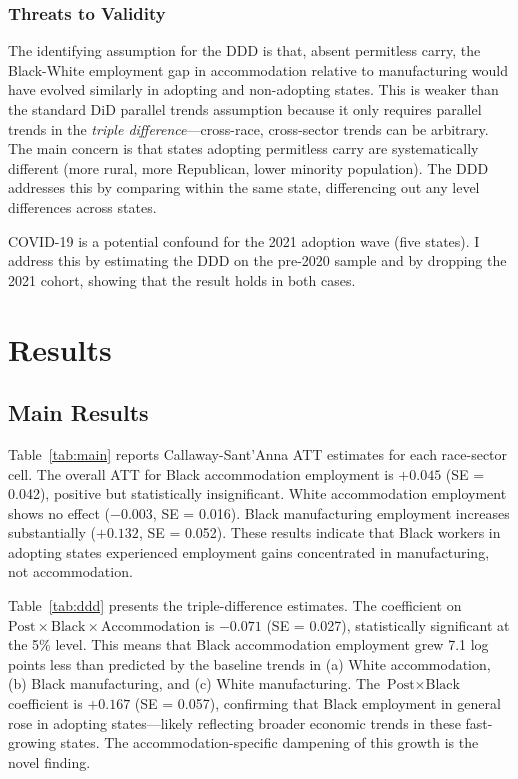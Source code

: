 \documentclass[12pt]{article}
\begin{document}
\subsubsection*{Threats to Validity} The identifying assumption for the DDD is that, absent permitless carry, the Black-White employment gap in accommodation relative to manufacturing would have evolved similarly in adopting and non-adopting states. This is weaker than the standard DiD parallel trends assumption because it only requires parallel trends in the \emph{triple difference}---cross-race, cross-sector trends can be arbitrary. The main concern is that states adopting permitless carry are systematically different (more rural, more Republican, lower minority population). The DDD addresses this by comparing within the same state, differencing out any level differences across states.

COVID-19 is a potential confound for the 2021 adoption wave (five states). I address this by estimating the DDD on the pre-2020 sample and by dropping the 2021 cohort, showing that the result holds in both cases.

\section{Results}
\label{sec:results}

\subsection{Main Results}



Table~\ref{tab:main} reports Callaway-Sant'Anna ATT estimates for each race-sector cell. The overall ATT for Black accommodation employment is $+0.045$ (SE = 0.042), positive but statistically insignificant. White accommodation employment shows no effect ($-0.003$, SE = 0.016). Black manufacturing employment increases substantially ($+0.132$, SE = 0.052). These results indicate that Black workers in adopting states experienced employment gains concentrated in manufacturing, not accommodation.



Table~\ref{tab:ddd} presents the triple-difference estimates. The coefficient on $\text{Post} \times \text{Black} \times \text{Accommodation}$ is $-0.071$ (SE = 0.027), statistically significant at the 5\% level. This means that Black accommodation employment grew 7.1 log points less than predicted by the baseline trends in (a) White accommodation, (b) Black manufacturing, and (c) White manufacturing. The $\text{Post} \times \text{Black}$ coefficient is $+0.167$ (SE = 0.057), confirming that Black employment in general rose in adopting states---likely reflecting broader economic trends in these fast-growing states. The accommodation-specific dampening of this growth is the novel finding.
\end{document}
